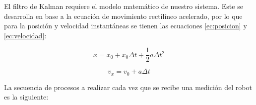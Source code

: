 El filtro de Kalman requiere el modelo matemático de nuestro sistema. Este se desarrolla en base a la ecuación de movimiento rectilíneo acelerado, por lo que para la posición y velocidad instantáneas se tienen las ecuaciones \ref{ec:posicion} y \ref{ec:velocidad}:

\begin{equation}
    x = x_0 + x_0 \Delta t + \frac{1}{2} a \Delta t^2
    \label{ec:posicion}
\end{equation}

\begin{equation}
    v_x = v_0 + a\Delta t
    \label{ec:velocidad}
\end{equation}

La secuencia de procesos a realizar cada vez que se recibe una medición del robot es la siguiente: \\

